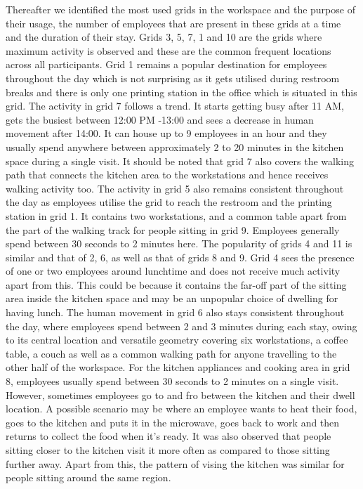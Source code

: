 \documentclass[acmtog]{acmart}
\begin{document}
Thereafter we identified the most used grids in the workspace and the purpose of their usage, the number of employees that are present in these grids at a time and the duration of their stay. Grids 3, 5, 7, 1 and 10 are the grids where maximum activity is observed and these are the common frequent locations across all participants. Grid 1 remains a popular destination for employees throughout the day which is not surprising as it gets utilised during restroom breaks and there is only one printing station in the office which is situated in this grid. The activity in grid 7 follows a trend. It starts getting busy after 11 AM, gets the busiest between 12:00 PM -13:00 and sees a decrease in human movement after 14:00. It can house up to 9 employees in an hour and they usually spend anywhere between approximately 2 to 20 minutes in the kitchen space during a single visit. It should be noted that grid 7 also covers the walking path that connects the kitchen area to the workstations and hence receives walking activity too. The activity in grid 5 also remains consistent throughout the day as employees utilise the grid to reach the restroom and the printing station in grid 1. It contains two workstations, and a common table apart from the part of the walking track for people sitting in grid 9. Employees generally spend between 30 seconds to 2 minutes here.  The popularity of grids 4 and 11 is similar and that of 2, 6, as well as that of grids 8 and 9. Grid 4 sees the presence of one or two employees around lunchtime and does not receive much activity apart from this. This could be because it contains the far-off part of the sitting area inside the kitchen space and may be an unpopular choice of dwelling for having lunch. The human movement in grid 6 also stays consistent throughout the day, where employees spend between 2 and 3 minutes during each stay, owing to its central location and versatile geometry covering six workstations, a coffee table, a couch as well as a common walking path for anyone travelling to the other half of the workspace. For the kitchen appliances and cooking area in grid 8, employees usually spend between 30 seconds to 2 minutes on a single visit. However, sometimes employees go to and fro between the kitchen and their dwell location. A possible scenario may be where an employee wants to heat their food, goes to the kitchen and puts it in the microwave, goes back to work and then returns to collect the food when it's ready. It was also observed that people sitting closer to the kitchen visit it more often as compared to those sitting further away. Apart from this, the pattern of vising the kitchen was similar for people sitting around the same region.
\end{document}

